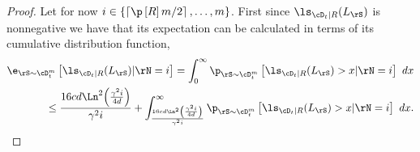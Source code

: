 \begin{proof}
    Let for now $ i\in \{\left\lceil\p\left[R\right]m/2\right\rceil,\ldots,m  \}  $. First since $ \ls_{\cD_{t}|R}(L_{\rS}) $ is nonnegative we have that its expectation can be calculated in terms of its cumulative distribution function,
    \begin{align}\label{eq:condtionalexpectation0}
     \e_{\rS\sim\cD_{t}^{m}}\left[\ls_{\cD_{t}|R}(L_{\rS})|\rN=i\right]=\int_{0}^{\infty}\p_{\rS\sim \cD_{t}^{m}}\left[\ls_{\cD_{t}|R}(L_{\rS})> x|\rN=i \right] \ dx\nonumber
     \\
     \leq \frac{16cd\Ln^{2}{\left( \frac{\gamma^{2}i}{4d}\right)}}{\gamma^{2}i}+\int_{\frac{16cd\Ln^{2}{\left( \frac{\gamma^{2}i}{4d}\right)}}{\gamma^{2}i}}^{\infty} \p_{\rS\sim\cD^{m}_{t}}\left[\ls_{\cD_{t}|R}(L_{\rS})> x|\rN=i \right] \ dx.
    \end{align} 


\end{proof}
